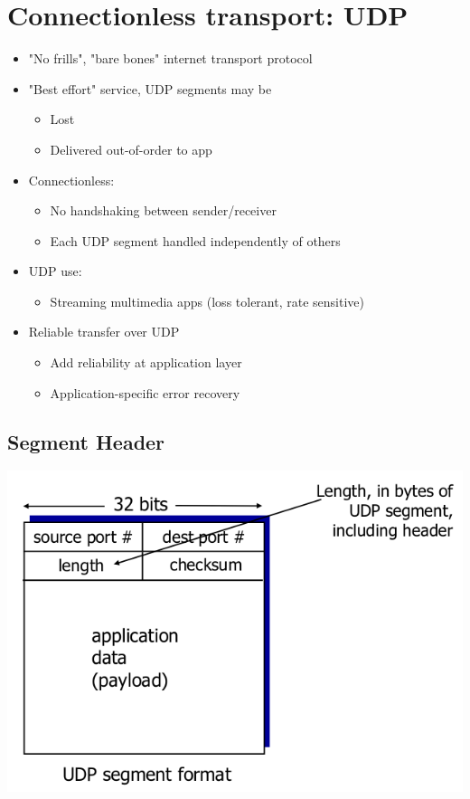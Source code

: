 \documentclass{article}[18pt]
\begin{document}
\section{Connectionless transport: UDP}
\begin{itemize}
	\item "No frills", "bare bones" internet transport protocol
	\item "Best effort" service, UDP segments may be
	\begin{itemize}
		\item Lost
		\item Delivered out-of-order to app
	\end{itemize}
	\item Connectionless:
	\begin{itemize}
		\item No handshaking between sender/receiver
		\item Each UDP segment handled independently of others
	\end{itemize}
	\item UDP use:
	\begin{itemize}
		\item Streaming multimedia apps (loss tolerant, rate sensitive)
	\end{itemize}
	\item Reliable transfer over UDP
	\begin{itemize}
		\item Add reliability at application layer
		\item Application-specific error recovery
	\end{itemize}
\end{itemize}
\subsection{Segment Header}
\begin{center}
	\includegraphics[scale=0.7]{udp}
\end{center}
\end{document}
